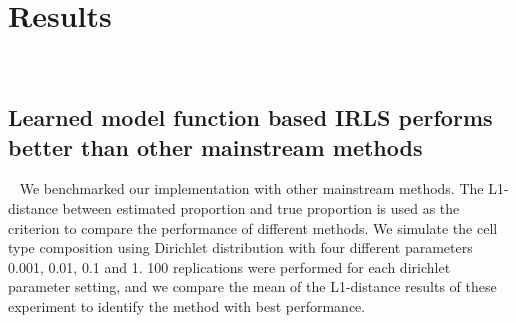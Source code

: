 \documentclass[10pt, a4paper, oneside]{article}
\begin{document}
\section{Results}  %
\subsection{Learned model function based IRLS performs better than other mainstream methods}  %
\justify
We benchmarked our implementation with other mainstream methods. The L1-distance between estimated proportion and true proportion 
is used as the criterion to compare the
performance of different methods. We simulate the cell type composition using Dirichlet distribution with
four different parameters 0.001, 0.01, 0.1 and 1.
100 replications were performed for each dirichlet parameter setting, and we compare the mean of the L1-distance results of these experiment
to identify the method with best performance. 
\end{document}
